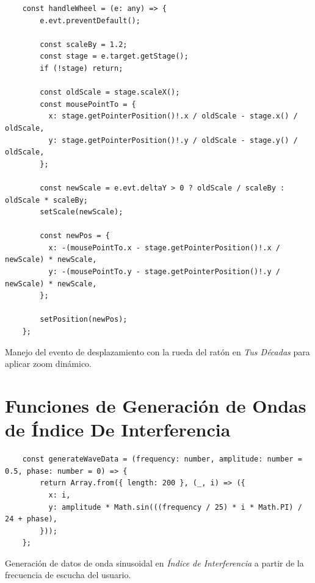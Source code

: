 \begin{ifalgorithm}[H]
    \begin{lstlisting}
    const handleWheel = (e: any) => {
        e.evt.preventDefault();

        const scaleBy = 1.2;
        const stage = e.target.getStage();
        if (!stage) return;

        const oldScale = stage.scaleX();
        const mousePointTo = {
          x: stage.getPointerPosition()!.x / oldScale - stage.x() / oldScale,
          y: stage.getPointerPosition()!.y / oldScale - stage.y() / oldScale,
        };

        const newScale = e.evt.deltaY > 0 ? oldScale / scaleBy : oldScale * scaleBy;
        setScale(newScale);

        const newPos = {
          x: -(mousePointTo.x - stage.getPointerPosition()!.x / newScale) * newScale,
          y: -(mousePointTo.y - stage.getPointerPosition()!.y / newScale) * newScale,
        };

        setPosition(newPos);
    };
    \end{lstlisting}
    \caption{Manejo del evento de desplazamiento con la rueda del ratón en \textit{Tus Décadas} para aplicar zoom dinámico.}
    \label{alg:handle_wheel_tus_decadas}
\end{ifalgorithm}

\section*{Funciones de Generación de Ondas de Índice De Interferencia}

\begin{ifalgorithm}[H]
    \begin{lstlisting}
    const generateWaveData = (frequency: number, amplitude: number = 0.5, phase: number = 0) => {
        return Array.from({ length: 200 }, (_, i) => ({
          x: i,
          y: amplitude * Math.sin(((frequency / 25) * i * Math.PI) / 24 + phase),
        }));
    };
    \end{lstlisting}
    \caption{Generación de datos de onda sinusoidal en \textit{Índice de Interferencia} a partir de la frecuencia de escucha del usuario.}
    \label{alg:generate_wave_data}
\end{ifalgorithm}

